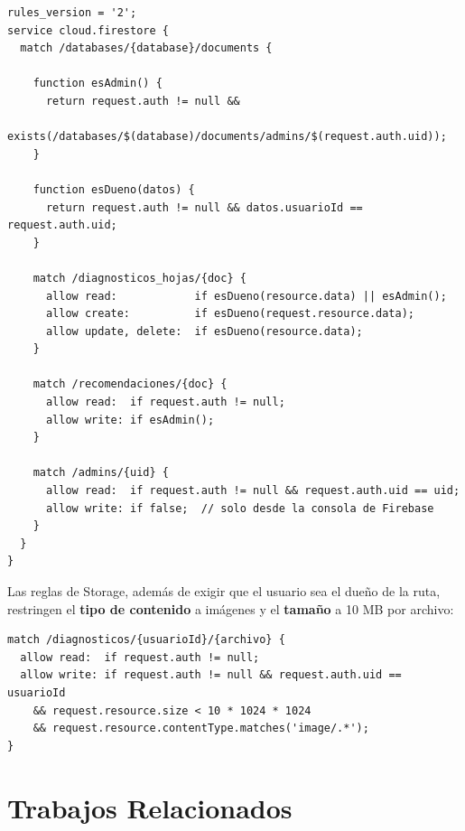 \documentclass[12pt,a4paper]{article}
\begin{document}
\begin{lstlisting}[language=JS, caption={Reglas de seguridad de Cloud Firestore (extracto)}, label={lst:rules}]
rules_version = '2';
service cloud.firestore {
  match /databases/{database}/documents {

    function esAdmin() {
      return request.auth != null &&
        exists(/databases/$(database)/documents/admins/$(request.auth.uid));
    }

    function esDueno(datos) {
      return request.auth != null && datos.usuarioId == request.auth.uid;
    }

    match /diagnosticos_hojas/{doc} {
      allow read:            if esDueno(resource.data) || esAdmin();
      allow create:          if esDueno(request.resource.data);
      allow update, delete:  if esDueno(resource.data);
    }

    match /recomendaciones/{doc} {
      allow read:  if request.auth != null;
      allow write: if esAdmin();
    }

    match /admins/{uid} {
      allow read:  if request.auth != null && request.auth.uid == uid;
      allow write: if false;  // solo desde la consola de Firebase
    }
  }
}
\end{lstlisting}

Las reglas de Storage, además de exigir que el usuario sea el dueño de la ruta,
restringen el \textbf{tipo de contenido} a imágenes y el \textbf{tamaño} a 10 MB
por archivo:

\begin{lstlisting}[language=JS, caption={Reglas de Firebase Storage (extracto)}, label={lst:storagerules}]
match /diagnosticos/{usuarioId}/{archivo} {
  allow read:  if request.auth != null;
  allow write: if request.auth != null && request.auth.uid == usuarioId
    && request.resource.size < 10 * 1024 * 1024
    && request.resource.contentType.matches('image/.*');
}
\end{lstlisting}

\section{Trabajos Relacionados}
\end{document}
